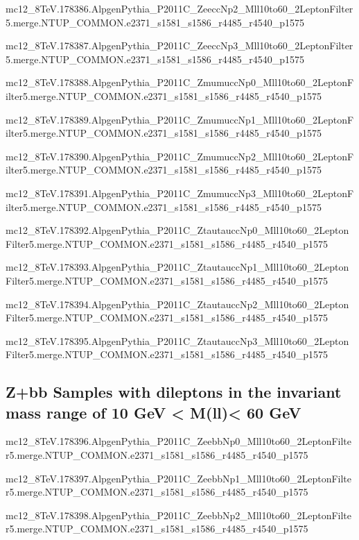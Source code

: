 mc12\_8TeV.178386.AlpgenPythia\_P2011C\_ZeeccNp2\_Mll10to60\_2LeptonFilter5.merge.NTUP\_COMMON.e2371\_s1581\_s1586\_r4485\_r4540\_p1575

mc12\_8TeV.178387.AlpgenPythia\_P2011C\_ZeeccNp3\_Mll10to60\_2LeptonFilter5.merge.NTUP\_COMMON.e2371\_s1581\_s1586\_r4485\_r4540\_p1575

mc12\_8TeV.178388.AlpgenPythia\_P2011C\_ZmumuccNp0\_Mll10to60\_2LeptonFilter5.merge.NTUP\_COMMON.e2371\_s1581\_s1586\_r4485\_r4540\_p1575

mc12\_8TeV.178389.AlpgenPythia\_P2011C\_ZmumuccNp1\_Mll10to60\_2LeptonFilter5.merge.NTUP\_COMMON.e2371\_s1581\_s1586\_r4485\_r4540\_p1575

mc12\_8TeV.178390.AlpgenPythia\_P2011C\_ZmumuccNp2\_Mll10to60\_2LeptonFilter5.merge.NTUP\_COMMON.e2371\_s1581\_s1586\_r4485\_r4540\_p1575

mc12\_8TeV.178391.AlpgenPythia\_P2011C\_ZmumuccNp3\_Mll10to60\_2LeptonFilter5.merge.NTUP\_COMMON.e2371\_s1581\_s1586\_r4485\_r4540\_p1575

mc12\_8TeV.178392.AlpgenPythia\_P2011C\_ZtautauccNp0\_Mll10to60\_2LeptonFilter5.merge.NTUP\_COMMON.e2371\_s1581\_s1586\_r4485\_r4540\_p1575

mc12\_8TeV.178393.AlpgenPythia\_P2011C\_ZtautauccNp1\_Mll10to60\_2LeptonFilter5.merge.NTUP\_COMMON.e2371\_s1581\_s1586\_r4485\_r4540\_p1575

mc12\_8TeV.178394.AlpgenPythia\_P2011C\_ZtautauccNp2\_Mll10to60\_2LeptonFilter5.merge.NTUP\_COMMON.e2371\_s1581\_s1586\_r4485\_r4540\_p1575

mc12\_8TeV.178395.AlpgenPythia\_P2011C\_ZtautauccNp3\_Mll10to60\_2LeptonFilter5.merge.NTUP\_COMMON.e2371\_s1581\_s1586\_r4485\_r4540\_p1575



\subsection{Z+bb Samples with dileptons in the invariant mass range of 10 GeV < M(ll)< 60 GeV}

mc12\_8TeV.178396.AlpgenPythia\_P2011C\_ZeebbNp0\_Mll10to60\_2LeptonFilter5.merge.NTUP\_COMMON.e2371\_s1581\_s1586\_r4485\_r4540\_p1575

mc12\_8TeV.178397.AlpgenPythia\_P2011C\_ZeebbNp1\_Mll10to60\_2LeptonFilter5.merge.NTUP\_COMMON.e2371\_s1581\_s1586\_r4485\_r4540\_p1575

mc12\_8TeV.178398.AlpgenPythia\_P2011C\_ZeebbNp2\_Mll10to60\_2LeptonFilter5.merge.NTUP\_COMMON.e2371\_s1581\_s1586\_r4485\_r4540\_p1575

